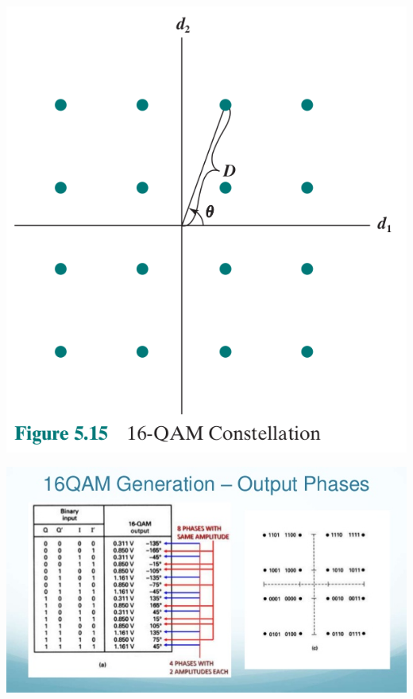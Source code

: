 \documentclass[pdflatex,compress]{beamer}
\begin{document}
\begin{frame}
	\begin{center}
		\includegraphics[width=0.7\linewidth]{img/img21}
	\end{center}
\end{frame}

\begin{frame}
	\begin{center}
		\includegraphics[width=\linewidth]{img/img22}
	\end{center}
\end{frame}
\end{document}

